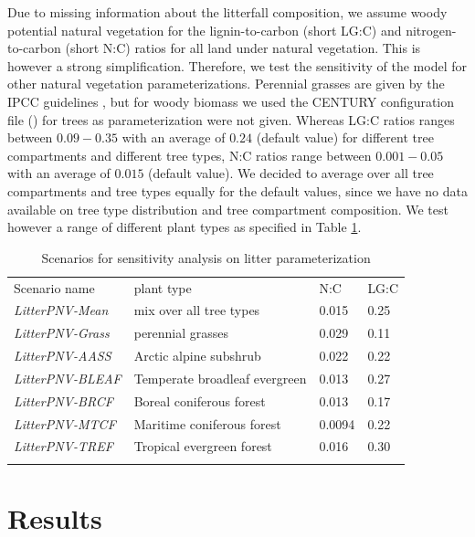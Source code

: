\documentclass[gc, manuscript]{copernicus}
\begin{document}
Due to missing information about the litterfall composition, we assume woody potential natural vegetation for the lignin-to-carbon (short LG:C) and nitrogen-to-carbon (short N:C) ratios for all land under natural vegetation. This is however a strong simplification. Therefore, we test the sensitivity of the model for other natural vegetation parameterizations. Perennial grasses are given by the IPCC guidelines \citep{calvo_buendia_ipcc_2019}, but for woody biomass we used the CENTURY configuration file (\citep{century_model_2000}) for trees as parameterization were not given. Whereas LG:C ratios ranges between \(0.09-0.35\) with an average of \(0.24\) (default value) for different tree compartments and different tree types, N:C ratios range between \(0.001-0.05\) with an average of \(0.015\) (default value). We decided to average over all tree compartments and tree types equally for the default values, since we have no data available on tree type distribution and tree compartment composition. We test however a range of different plant types as specified in Table \ref{tab:scenlitterpnv}.

 \begin{table}[h]
 \caption{Scenarios for sensitivity analysis on litter parameterization}
 \begin{tabular}{l l l l}
 \tophline
  Scenario name & plant type & N:C & LG:C \\
  \middlehline
  \textit{LitterPNV-Mean} & mix over all tree types & 0.015  & 0.25 \\
  \textit{LitterPNV-Grass} & perennial grasses     & 0.029  & 0.11 \\
  \textit{LitterPNV-AASS}  & Arctic alpine subshrub           & 0.022  & 0.22 \\
  \textit{LitterPNV-BLEAF} & Temperate broadleaf evergreen    & 0.013  & 0.27 \\
  \textit{LitterPNV-BRCF}  & Boreal coniferous forest         & 0.013  & 0.17 \\
  \textit{LitterPNV-MTCF}  & Maritime coniferous forest       & 0.0094 & 0.22 \\
  \textit{LitterPNV-TREF}  & Tropical evergreen forest        & 0.016  & 0.30 \\
 \bottomhline
 \end{tabular}
 \belowtable{}
 \label{tab:scenlitterpnv}
 \end{table}

\newpage

\hypertarget{results}{%
\section{Results}\label{results}}
\end{document}
